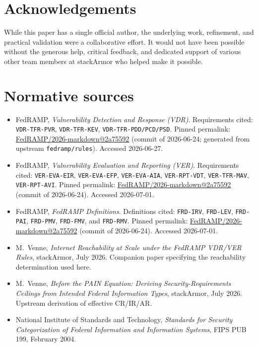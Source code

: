 \documentclass[11pt]{article}
\makeatletter
\newcommand{\vdrcite}{\href{https://github.com/FedRAMP/2026-markdown/blob/2a75592f0e1f86a48b2888d29af6c570c419a7a5/providers/rev5/rules/vulnerability-detection-and-response.md}{FedRAMP/2026-markdown@2a75592}}
\newcommand{\vercite}{\href{https://github.com/FedRAMP/2026-markdown/blob/2a75592f0e1f86a48b2888d29af6c570c419a7a5/providers/rev5/rules/vulnerability-evaluation-and-reporting.md}{FedRAMP/2026-markdown@2a75592}}
\newcommand{\defcite}{\href{https://github.com/FedRAMP/2026-markdown/blob/2a75592f0e1f86a48b2888d29af6c570c419a7a5/definitions.md}{FedRAMP/2026-markdown@2a75592}}
\makeatother
\begin{document}
\section*{Acknowledgements}
While this paper has a single official author, the underlying work, refinement,
and practical validation were a collaborative effort. It would not have been
possible without the generous help, critical feedback, and dedicated support of
various other team members at stackArmor who helped make it possible.

\section*{Normative sources}
\begin{itemize}[leftmargin=3.4em]
\item[{[VDR]}] FedRAMP, \emph{Vulnerability Detection and Response (VDR)}.
  Requirements cited: \texttt{VDR-TFR-PVR}, \texttt{VDR-TFR-KEV},
  \texttt{VDR-TFR-PDD/PCD/PSD}. Pinned permalink: \vdrcite{} (commit of 2026-06-24;
  generated from upstream \texttt{fedramp/rules}). Accessed 2026-06-27.
\item[{[VER]}] FedRAMP, \emph{Vulnerability Evaluation and Reporting (VER)}.
  Requirements cited: \texttt{VER-EVA-EIR}, \texttt{VER-EVA-EFP},
  \texttt{VER-EVA-AIA}, \texttt{VER-RPT-VDT}, \texttt{VER-TFR-MAV},
  \texttt{VER-RPT-AVI}. Pinned permalink: \vercite{} (commit of 2026-06-24).
  Accessed 2026-07-01.
\item[{[DEF]}] FedRAMP, \emph{FedRAMP Definitions}. Definitions cited:
  \texttt{FRD-IRV}, \texttt{FRD-LEV}, \texttt{FRD-PAI},
  \texttt{FRD-PMV}, \texttt{FRD-FMV}, and \texttt{FRD-RMV}. Pinned permalink:
  \defcite{} (commit of 2026-06-24). Accessed 2026-07-01.
\item[{[EGR]}] M.~Venne, \emph{Internet Reachability at Scale under the FedRAMP
  VDR/VER Rules}, stackArmor,
  July 2026. Companion paper specifying the reachability determination used here.
\item[{[CEILING]}] M.~Venne, \emph{Before the PAIN Equation: Deriving
  Security-Requirements Ceilings from Intended Federal Information Types},
  stackArmor, July 2026. Upstream derivation of effective CR/IR/AR.
\item[{[FIPS199]}] National Institute of Standards and Technology,
  \emph{Standards for Security Categorization of Federal Information and
  Information Systems}, FIPS PUB 199, February 2004.

\end{itemize}
\end{document}
